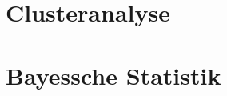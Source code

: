 \documentclass[8pt]{extarticle}
\begin{document}


\section{Clusteranalyse}




\section{Bayessche Statistik}
\end{document}
